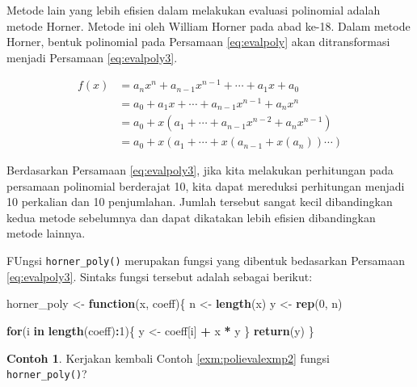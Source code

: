 \documentclass[
]{book}
\newenvironment{Shaded}{\begin{snugshade}}{\end{snugshade}}
\newcommand{\ControlFlowTok}[1]{\textcolor[rgb]{0.13,0.29,0.53}{\textbf{#1}}}
\newcommand{\DecValTok}[1]{\textcolor[rgb]{0.00,0.00,0.81}{#1}}
\newcommand{\FunctionTok}[1]{\textcolor[rgb]{0.13,0.29,0.53}{\textbf{#1}}}
\newcommand{\NormalTok}[1]{#1}
\newcommand{\OtherTok}[1]{\textcolor[rgb]{0.56,0.35,0.01}{#1}}
\newcommand{\SpecialCharTok}[1]{\textcolor[rgb]{0.81,0.36,0.00}{\textbf{#1}}}
\theoremstyle{definition}
\theoremstyle{definition}
\newtheorem{example}{Contoh}[chapter]
\theoremstyle{definition}
\theoremstyle{definition}
\theoremstyle{remark}
\begin{document}
Metode lain yang lebih efisien dalam melakukan evaluasi polinomial adalah metode Horner. Metode ini oleh William Horner pada abad ke-18. Dalam metode Horner, bentuk polinomial pada Persamaan \eqref{eq:evalpoly} akan ditransformasi menjadi Persamaan \eqref{eq:evalpoly3}.

\begin{equation}
\begin{split}
f\left(x\right)&=a_nx^n+a_{n-1}x^{n-1}+\cdots+a_1x+a_0\\
&= a_0+a_1x+\cdots+a_{n-1}x^{n-1}+a_nx^n\\
&= a_0+x\left(a_1+\cdots+a_{n-1}x^{n-2}+a_nx^{n-1}\right)\\
&= a_0+x\left(a_1+\cdots+x\left(a_{n-1}+x\left(a_n\right)\right)\cdots\right)
\end{split}
  \label{eq:evalpoly3}
\end{equation}

Berdasarkan Persamaan \eqref{eq:evalpoly3}, jika kita melakukan perhitungan pada persamaan polinomial berderajat 10, kita dapat mereduksi perhitungan menjadi 10 perkalian dan 10 penjumlahan. Jumlah tersebut sangat kecil dibandingkan kedua metode sebelumnya dan dapat dikatakan lebih efisien dibandingkan metode lainnya.

FUngsi \texttt{horner\_poly()} merupakan fungsi yang dibentuk bedasarkan Persamaan \eqref{eq:evalpoly3}. Sintaks fungsi tersebut adalah sebagai berikut:

\begin{Shaded}
\begin{Highlighting}[]
\NormalTok{horner\_poly }\OtherTok{\textless{}{-}} \ControlFlowTok{function}\NormalTok{(x, coeff)\{}
\NormalTok{  n }\OtherTok{\textless{}{-}} \FunctionTok{length}\NormalTok{(x)}
\NormalTok{  y }\OtherTok{\textless{}{-}} \FunctionTok{rep}\NormalTok{(}\DecValTok{0}\NormalTok{, n)}
  
  \ControlFlowTok{for}\NormalTok{(i }\ControlFlowTok{in} \FunctionTok{length}\NormalTok{(coeff)}\SpecialCharTok{:}\DecValTok{1}\NormalTok{)\{}
\NormalTok{    y }\OtherTok{\textless{}{-}}\NormalTok{ coeff[i] }\SpecialCharTok{+}\NormalTok{ x }\SpecialCharTok{*}\NormalTok{ y}
\NormalTok{  \}}
  \FunctionTok{return}\NormalTok{(y)}
\NormalTok{\}}
\end{Highlighting}
\end{Shaded}

\begin{example}
\protect\hypertarget{exm:polievalexmp3}{}\label{exm:polievalexmp3}Kerjakan kembali Contoh \ref{exm:polievalexmp2} fungsi \texttt{horner\_poly()}?
\end{example}
\end{document}

